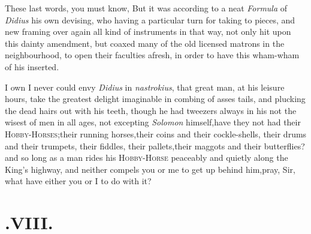\documentclass{article}
\begin{document}
These last words, you must know,\break
{} 
 But
it was according to a neat \textit{Formula} of \textit{Didius} his own devising, who
having a particular turn for taking to pieces, and new framing over again all
kind of instruments in that way, not only hit upon this dainty amendment, but coaxed
many of the old licensed matrons in the neighbourhood, to open their faculties
afresh, in order to have this wham-wham of his inserted.

I own I never could envy \textit{Didius} in
\textit{nastrokius}, that great man, at his leisure hours, take the
greatest delight imagin\-able in combing of asses tails, and plucking
the dead hairs out with his teeth, though he had tweezers always in
his
 not the wisest of
men in all ages, not excepting \textit{Solomon} himself,\tsk  have
they not had their
\textsc{Hobby-Horses};\tsk  their running
horses,\tsk  their coins and their cockle-shells, their drums and
their trumpets, their fiddles, their pallets,\tsk  their maggots
and their butterflies?\tsk  and so long as a man rides his
\textsc{Hobby-Horse} peaceably and quietly
along the King’s highway, and neither compels you or me to
get up behind him,\tsk  pray, Sir, what have either you or I to do
with it?

\section{.\enspace VIII.}
\end{document}
